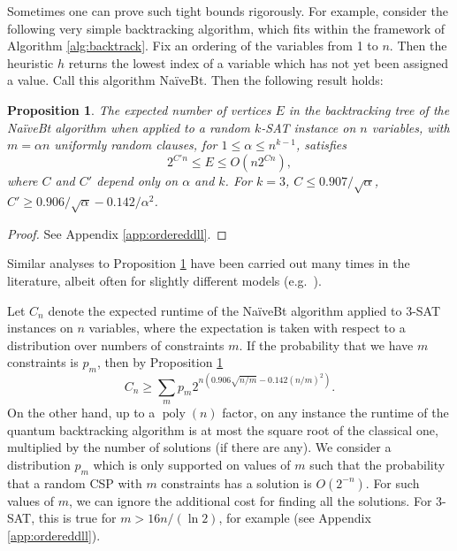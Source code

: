 \documentclass[11pt]{article}
\DeclareMathOperator{\poly}{poly}
\newtheorem{prop}[thm]{Proposition}
\begin{document}

Sometimes one can prove such tight bounds rigorously. For example, consider the following very simple backtracking algorithm, which fits within the framework of Algorithm \ref{alg:backtrack}. Fix an ordering of the variables from 1 to $n$. Then the heuristic $h$ returns the lowest index of a variable which has not yet been assigned a value. Call this algorithm Na\"iveBt. Then the following result holds:

\begin{prop}
\label{prop:exp}
The expected number of vertices $E$ in the backtracking tree of the Na\"iveBt algorithm when applied to a random $k$-SAT instance on $n$ variables, with $m = \alpha n$ uniformly random clauses, for $1 \le \alpha \le n^{k-1}$, satisfies
%
\[ 2^{C' n} \le E \le O(n 2^{C n}), \]
%
where $C$ and $C'$ depend only on $\alpha$ and $k$. For $k=3$, $C \le 0.907/\sqrt{\alpha}$, $C' \ge 0.906/\sqrt{\alpha} - 0.142/\alpha^2$.
\end{prop}

\begin{proof}
See Appendix \ref{app:ordereddll}.
\end{proof}

Similar analyses to Proposition \ref{prop:exp} have been carried out many times in the literature, albeit often for slightly different models (e.g.~\cite{brown81,purdom97}).

Let $C_n$ denote the expected runtime of the Na\"iveBt algorithm applied to 3-SAT instances on $n$ variables, where the expectation is taken with respect to a distribution over numbers of constraints $m$. If the probability that we have $m$ constraints is $p_m$, then by Proposition \ref{prop:exp}
%
\[ C_n \ge \sum_m p_m 2^{n(0.906 \sqrt{n/m} - 0.142 (n/m)^2) }. \]
%
On the other hand, up to a $\poly(n)$ factor, on any instance the runtime of the quantum backtracking algorithm is at most the square root of the classical one, multiplied by the number of solutions (if there are any). We consider a distribution $p_m$ which is only supported on values of $m$ such that the probability that a random CSP with $m$ constraints has a solution is $O(2^{-n})$. For such values of $m$, we can ignore the additional cost for finding all the solutions. For 3-SAT, this is true for $m > 16n/(\ln 2)$, for example (see Appendix \ref{app:ordereddll}).
\end{document}
